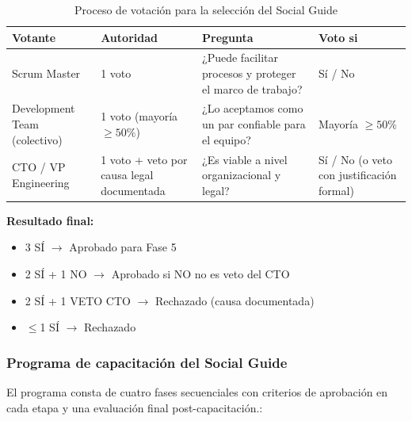 \FloatBarrier

\begin{table}[h]
    \centering
    \small
    \begin{tabularx}{\textwidth}{|l|l|X|X|}
        \hline
        \textbf{Votante} & \textbf{Autoridad}                                        & \textbf{Pregunta} & \textbf{Voto si} \\
        \hline
        Scrum Master
                         & 1 voto
                         & ¿Puede facilitar procesos y proteger el marco de trabajo?
                         & Sí / No                                                                                          \\
        \hline
        Development Team (colectivo)
                         & 1 voto (mayoría $\geq 50\%$)
                         & ¿Lo aceptamos como un par confiable para el equipo?
                         & Mayoría $\geq 50\%$                                                                              \\
        \hline
        CTO / VP Engineering
                         & 1 voto + veto por causa legal documentada
                         & ¿Es viable a nivel organizacional y legal?
                         & Sí / No (o veto con justificación formal)                                                        \\
        \hline
    \end{tabularx}
    \caption{Proceso de votación para la selección del Social Guide}
    \label{tab:consenso-seleccion}
\end{table}

\FloatBarrier

\textbf{Resultado final:}
\begin{itemize}
    \item 3 SÍ $\rightarrow$ Aprobado para Fase 5
    \item 2 SÍ + 1 NO $\rightarrow$ Aprobado si NO no es veto del CTO
    \item 2 SÍ + 1 VETO CTO $\rightarrow$ Rechazado (causa documentada)
    \item $\leq$1 SÍ $\rightarrow$ Rechazado
\end{itemize}

\subsubsection{Programa de capacitación del Social Guide}

El programa consta de cuatro fases secuenciales con criterios de aprobación en cada etapa y una evaluación final post-capacitación.:

